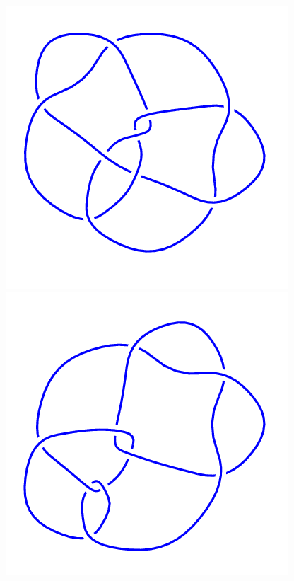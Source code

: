 \begin{figure}[H]
	\begin{minipage}[b]{.18\linewidth}
		\centering
		\includegraphics[width=\linewidth]{../data/9_41.png}
	\end{minipage}
	\begin{minipage}[b]{.18\linewidth}
		\centering
		\includegraphics[width=\linewidth]{../data/9_42.png}

\end{minipage}
\end{figure}
